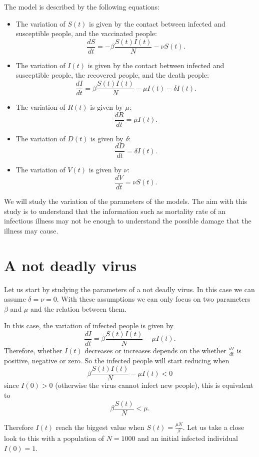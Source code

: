 \documentclass[14pt]{amsart}
\begin{document}
The model is described by the following equations:

\begin{itemize}
\item The variation of $S(t)$ is given by the contact between infected and susceptible people, and the vaccinated people:
    $$\frac{d S}{dt}=-\beta \frac{S(t)I(t)}{N} -\nu S(t).$$
\item The variation of $I(t)$ is given by the contact between infected and susceptible people, the recovered people, and the death people:
    $$\frac{d I}{dt}= \beta \frac{S(t)I(t)}{N} -\mu I(t) -\delta I(t).$$
\item The variation of $R(t)$ is given by $\mu$:
    $$\frac{d R}{dt}= \mu I(t).$$
\item The variation of $D(t)$ is given by $\delta$:
    $$\frac{d D}{dt}= \delta I(t).$$
\item The variation of $V(t)$ is given by $\nu$:
    $$\frac{d V}{dt}= \nu S(t).$$
\end{itemize}

We will study the variation of the parameters of the models. The aim with this study is to understand that the information such as mortality rate of an infectious illness may not be enough to understand the possible damage that the illness may cause.

\section{A not deadly virus}

Let us start by studying the parameters of a not deadly virus. In this case we can assume $\delta = \nu =0$. With these assumptions we can only focus on two parameters $\beta$ and $\mu$ and the relation between them.

In this case, the variation of infected people is given by     
$$\frac{d I}{dt}= \beta \frac{S(t)I(t)}{N} -\mu I(t).$$
Therefore, whether $I(t)$ decreases or increases depends on the whether $\frac{d I}{dt}$ is positive, negative or zero. So the infected people will start reducing when $$\beta \frac{S(t)I(t)}{N} -\mu I(t) < 0$$ since $I(0)> 0$ (otherwise the virus cannot infect new people), this is equivalent to 
\begin{equation}
\beta \frac{S(t)}{N} < \mu.
\end{equation}

Therefore $I(t)$ reach the biggest value when $S(t)=\frac{\mu N}{\beta}$. 
Let us take a close look to this with a population of $N=1000$ and an initial infected individual $I(0)=1$.
\end{document}
